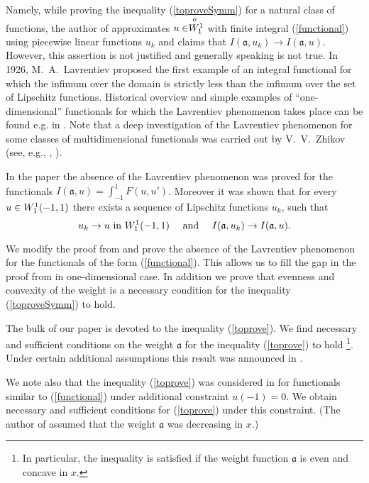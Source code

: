 Namely, while proving the inequality (\ref{toproveSymm}) for a natural class of functions,
the author of \cite{Br} approximates $u \in \stackrel{o\ }{W_1^1}$ with finite integral (\ref{functional})
using piecewise linear functions $u_k$ and claims that $I(\mathfrak a, u_k) \to I(\mathfrak a, u)$.
However, this assertion is not justified and generally speaking is not true.
In 1926, M.~A.~Lavrentiev proposed the first example of an integral functional
for which the infimum over the domain is strictly less than the infimum over the set of 
Lipschitz functions.
Historical overview and simple examples of ``one-dimensional'' 
functionals for which the Lavrentiev phenomenon takes place can be found e.g. in \cite{BGH}.
Note that a deep investigation of the Lavrentiev phenomenon for some classes of multidimensional 
functionals was carried out by V.~V.~Zhikov (see, e.g., \cite{Zh1}, \cite{Zh2}).

In the paper \cite{ASC} the absence of the Lavrentiev phenomenon was proved for the functionals
$I(\mathfrak a, u) = \int_{-1}^1 F(u, u')$. Moreover it was shown that for every $u \in W_1^1(-1, 1)$ 
there exists a sequence of Lipschitz functions $u_k$, such that
\begin{equation}
\label{convergence}
u_k \to u \text{ in } \W (-1, 1) \quad \text{ and } \quad I (\mathfrak a, u_k) \to I (\mathfrak a, u).
\end{equation}

We modify the proof from \cite{ASC} and prove the absence of the Lavrentiev phenomenon
for the functionals of the form (\ref{functional}).
This allows us to fill the gap in the proof from \cite{Br} in one-dimensional case.
In addition we prove that evenness and convexity of the weight is a necessary condition
for the inequality (\ref{toproveSymm}) to hold.

The bulk of our paper is devoted to the inequality (\ref{toprove}).
We find necessary and sufficient conditions on the weight $\mathfrak a$ for the inequality 
(\ref{toprove}) to hold%
\footnote{In particular, the inequality is satisfied if the weight function $\mathfrak a$ is even 
and concave in $x$.}.
Under certain additional assumptions this result was announced in \cite{DAN}.

We note also that the inequality (\ref{toprove}) was considered in \cite{Lan}
for functionals similar to (\ref{functional}) under additional constraint $u(-1) = 0$.
We obtain necessary and sufficient conditions for (\ref{toprove}) under this constraint.
(The author of \cite{Lan} assumed that the weight $\mathfrak a$ was decreasing in $x$.)

